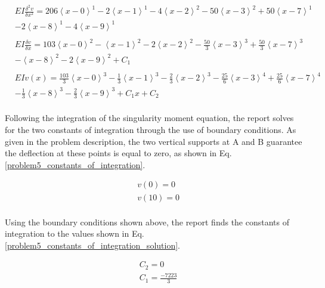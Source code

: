 \documentclass[a4paper]{article}
\begin{document}
\begin{equation}
    \begin{split}
& EI \frac{\delta^2 v}{\delta x^2} = 206\left<x-0\right>^1 - 2\left<x-1\right>^1 -  4\left<x-2\right>^2 - 50\left<x-3\right>^2 + 50\left<x-7\right>^1 \\
& - 2\left<x-8\right>^1 -  4\left<x-9\right>^1 \\
& \\
& EI \frac{\delta v}{\delta x} = 103\left<x-0\right>^2 - \left<x-1\right>^2 -  2\left<x-2\right>^2 - \frac{50}{3}\left<x-3\right>^3 + \frac{50}{3}\left<x-7\right>^3 \\
& - \left<x-8\right>^2 -  2\left<x-9\right>^2  + C_1\\
& \\
& EI v(x) = \frac{103}{3}\left<x-0\right>^3 - \frac{1}{3}\left<x-1\right>^3 -  \frac{2}{3}\left<x-2\right>^3 - \frac{25}{6}\left<x-3\right>^4 + \frac{25}{6}\left<x-7\right>^4 \\
& - \frac{1}{3}\left<x-8\right>^3 -  \frac{2}{3}\left<x-9\right>^3 + C_1x + C_2 \\
    \end{split}
\label{problem5_equations}
\end{equation}

Following the integration of the singularity moment equation, the report solves for the two constants of integration through the use of boundary conditions. As given in the problem description, the two vertical supports at A and B guarantee the deflection at these points is equal to zero, as shown in Eq. \ref{problem5_constants_of_integration}.

\begin{equation}
\begin{split}
	& v(0) = 0 \\
	& v(10) = 0 \\
\end{split}
\label{problem5_constants_of_integration}
\end{equation}

Using the boundary conditions shown above, the report finds the constants of integration to the values shown in Eq. \ref{problem5_constants_of_integration_solution}.

\begin{equation}
\begin{split}
	& C_2 = 0 \\
	& C_1 = \frac{-7223}{3} \\
\end{split}
\label{problem5_constants_of_integration_solution}
\end{equation}
\end{document}
